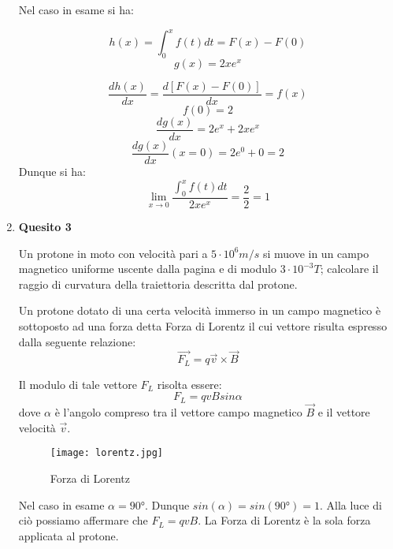 \documentclass[a4paper,12pt]{article}
\begin{document}
\begin{enumerate}
Nel caso in esame si ha:

\begin{equation}h(x)=\int_{0}^x f(t)dt=F(x)-F(0)\end{equation}
\begin{equation}g(x)=2xe^x\end{equation}

\begin{equation}\frac{dh(x)}{dx}=\frac{d[F(x)-F(0)]}{dx}=f(x)\end{equation}
\begin{equation}f(0)=2\end{equation}
\begin{equation}\frac{dg(x)}{dx}=2e^x+2xe^x\end{equation}
\begin{equation}\frac{dg(x)}{dx}(x=0)=2e^0+0=2\end{equation}
Dunque si ha:
\begin{equation}\lim_{x\rightarrow 0}\frac{\int_{0}^x f(t)dt}{2xe^x}=\frac{2}{2}=1\end{equation}

\item \textbf{Quesito 3}

 Un protone in moto con velocità pari a $5\cdot10^6 m/s$ si muove in un campo magnetico uniforme uscente dalla pagina e di modulo $3\cdot10^{-3} T$; calcolare il raggio di curvatura della traiettoria descritta dal protone.

Un protone dotato di una certa velocità immerso in un campo magnetico è sottoposto ad una forza detta Forza di Lorentz il cui vettore risulta espresso dalla seguente relazione:
\begin{equation}\vec{F_L} = q \vec{v} {\times} \vec{B}\end{equation}


Il modulo di tale vettore $F_L$ risolta essere:
\begin{equation}F_L=qvBsin\alpha\end{equation}
dove $\alpha$ è l'angolo compreso tra il vettore campo magnetico $\vec{B}$ e il vettore velocità $\vec{v}$.

\begin{figure}[H]
\centering
\texttt{[image: lorentz.jpg]}
\caption {Forza di Lorentz}
\end{figure}

Nel caso in esame $\alpha=\ang{90}$. Dunque $sin(\alpha)=sin(\ang{90})=1$. Alla luce di ciò possiamo affermare che $F_L=qvB$.
La Forza di Lorentz è la sola forza applicata al protone. 


\end{enumerate}
\end{document}
